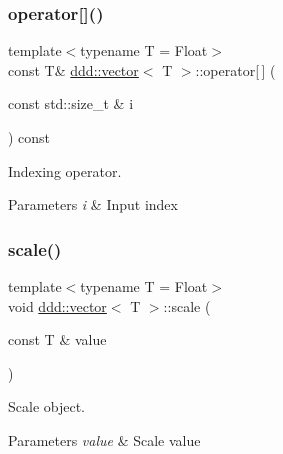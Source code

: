 \subsubsection{\texorpdfstring{operator[]()}{operator[]()}\hspace{0.1cm}{\footnotesize\ttfamily [2/2]}}
{\footnotesize\ttfamily template$<$typename T = Float$>$ \\
const T\& \hyperlink{classddd_1_1vector}{ddd\+::vector}$<$ T $>$\+::operator\mbox{[}$\,$\mbox{]} (\begin{DoxyParamCaption}\item[{const std\+::size\+\_\+t \&}]{i }\end{DoxyParamCaption}) const\hspace{0.3cm}{\ttfamily [inline]}}



Indexing operator. 


\begin{DoxyParams}{Parameters}
{\em i} & Input index \\
\hline
\end{DoxyParams}
\mbox{\label{classddd_1_1vector_a958883e517d457e63d62be46580db5a0}} 
\subsubsection{\texorpdfstring{scale()}{scale()}}
{\footnotesize\ttfamily template$<$typename T = Float$>$ \\
void \hyperlink{classddd_1_1vector}{ddd\+::vector}$<$ T $>$\+::scale (\begin{DoxyParamCaption}\item[{const T \&}]{value }\end{DoxyParamCaption})\hspace{0.3cm}{\ttfamily [inline]}}



Scale object. 


\begin{DoxyParams}{Parameters}
{\em value} & Scale value \\
\hline
\end{DoxyParams}
\mbox{\label{classddd_1_1vector_abf367c7da55ad2c770a90a3ed3c01d5a}} 

